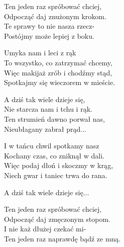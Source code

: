 \begin{text}
    Ten jeden raz spróbować chciej,\\
    Odpocząć daj znużonym krokom.\\
    Te sprawy to nie nasza rzecz-\\
    Postójmy może lepiej z boku.

    Umyka nam i leci z rąk\\
    To wszystko, co zatrzymać chcemy,\\
    Więc makijaż zrób i chodźmy stąd,\\
    Spotkajmy się wieczorem w mieście.

    A dziś tak wiele dzieje się,\\
    Nie starcza nam i tchu i rąk.\\
    Ten strumień dawno porwał nas,\\
    Nieubłagany zabrał prąd...

    I w tańcu chwil spotkamy nasz\\
    Kochany czas, co zniknął w dali.\\
    Więc podaj dłoń i skoczmy w krąg,\\
    Niech gwar i taniec trwa do rana.

    A dziś tak wiele dzieje się...

    Ten jeden raz spróbować chciej,\\
    Odpocząć daj zmęczonym stopom.\\
    I nie każ dłużej czekać mi-\\
    Ten jeden raz naprawdę bądź ze mną.
\end{text}
\begin{chord}

\end{chord}
